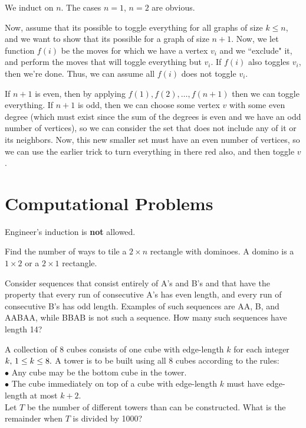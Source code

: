 \documentclass[mast]{lucky}
\newcommand{\skipline}{\vspace{2mm}}
\begin{document}
\begin{sol}
We induct on $n$. The cases $n=1$, $n=2$ are obvious.

Now, assume that its possible to toggle everything for all graphs of size $k\leq n$, and we want to show that its possible for a graph of size $n+1$. Now, we let function $f(i)$ be the moves for which we have a vertex $v_i$ and we ``exclude" it, and perform the moves that will toggle everything but $v_i$. If $f(i)$ also toggles $v_i$, then we're done. Thus, we can assume all $f(i)$ does not toggle $v_i$.

If $n+1$ is even, then by applying $f(1),f(2),\dots,f(n+1)$ then we can toggle everything. If $n+1$ is odd, then we can choose some vertex $v$ with some even degree (which must exist since the sum of the degrees is even and we have an odd number of vertices), so we can consider the set that does not include any of it or its neighbors. Now, this new smaller set must have an even number of vertices, so we can use the earlier trick to turn everything in there red also, and then toggle $v$.

\end{sol}

\newpage
\section{Computational Problems}
Engineer's induction is \textbf{not} allowed.

\skipline

\begin{prob}[Classic]{1}
Find the number of ways to tile a $2\times n$ rectangle with dominoes. A domino is a $1\times 2$ or a $2 \times 1$ rectangle.
\end{prob}

\begin{prob}[AIME 2008]{4}
Consider sequences that consist entirely of A's and B's and that have the property that every run of consecutive A's has even length, and every run of consecutive B's has odd length. Examples of such sequences are AA, B, and AABAA, while BBAB is not such a sequence. How many such sequences have length 14?
\end{prob}

\begin{prob}[AIME 2006/11]{2}
A collection of 8 cubes consists of one cube with edge-length $k$ for each integer $k,\thinspace 1 \le k \le 8.$  A tower is to be built using all 8 cubes according to the rules:\\[1\baselineskip]$\bullet$ Any cube may be the bottom cube in the tower.\\[0\baselineskip]$\bullet$ The cube immediately on top of a cube with edge-length $k$ must have edge-length at most $k+2.$\\[1\baselineskip]Let $T$ be the number of different towers than can be constructed.  What is the remainder when $T$ is divided by 1000?
\end{prob}
\end{document}
